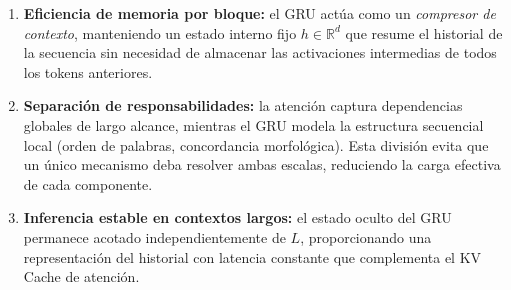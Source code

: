 \begin{enumerate}
    \item \textbf{Eficiencia de memoria por bloque:} el GRU actúa como un \textit{compresor de contexto}, manteniendo un estado interno fijo $h \in \mathbb{R}^d$ que resume el historial de la secuencia sin necesidad de almacenar las activaciones intermedias de todos los tokens anteriores.
    \item \textbf{Separación de responsabilidades:} la atención captura dependencias globales de largo alcance, mientras el GRU modela la estructura secuencial local (orden de palabras, concordancia morfológica). Esta división evita que un único mecanismo deba resolver ambas escalas, reduciendo la carga efectiva de cada componente.
    \item \textbf{Inferencia estable en contextos largos:} el estado oculto del GRU permanece acotado independientemente de $L$, proporcionando una representación del historial con latencia constante que complementa el KV Cache de atención.
\end{enumerate}